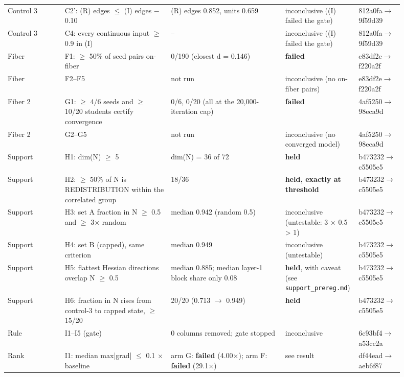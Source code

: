 {\begin{longtable}{R{0.14\linewidth} R{0.26\linewidth} R{0.29\linewidth} R{0.10\linewidth} R{0.11\linewidth}}
Control 3 & C2': (R) edges $\leq$ (I) edges $-$ 0.10 & (R) edges 0.852, units 0.659 & inconclusive ((I) failed the gate) & 812a0fa$\to$\allowbreak{}9f59d39 \\
Control 3 & C4: every continuous input $\geq$ 0.9 in (I) & -- & inconclusive ((I) failed the gate) & 812a0fa$\to$\allowbreak{}9f59d39 \\
Fiber & F1: $\geq$ 50\% of seed pairs on-fiber & 0/190 (closest d = 0.146) & \textbf{failed} & e83df2e$\to$\allowbreak{}f220a2f \\
Fiber & F2--F5 & not run & inconclusive (no on-fiber pairs) & e83df2e$\to$\allowbreak{}f220a2f \\
Fiber 2 & G1: $\geq$ 4/6 seeds and $\geq$ 10/20 students certify convergence & 0/6, 0/20 (all at the 20,000-iteration cap) & \textbf{failed} & 4af5250$\to$\allowbreak{}98eca9d \\
Fiber 2 & G2--G5 & not run & inconclusive (no converged model) & 4af5250$\to$\allowbreak{}98eca9d \\
Support & H1: dim(N) $\geq$ 5 & dim(N) = 36 of 72 & \textbf{held} & b473232$\to$\allowbreak{}c5505e5 \\
Support & H2: $\geq$ 50\% of N is REDISTRIBUTION within the correlated group & 18/36 & \textbf{held, exactly at threshold} & b473232$\to$\allowbreak{}c5505e5 \\
Support & H3: set A fraction in N $\geq$ 0.5 and $\geq$ 3$\times$ random & median 0.942 (random 0.5) & inconclusive (untestable: 3 $\times$ 0.5 > 1) & b473232$\to$\allowbreak{}c5505e5 \\
Support & H4: set B (capped), same criterion & median 0.949 & inconclusive (untestable) & b473232$\to$\allowbreak{}c5505e5 \\
Support & H5: flattest Hessian directions overlap N $\geq$ 0.5 & median 0.885; median layer-1 block share only 0.08 & \textbf{held}, with caveat (see \texttt{support\_\allowbreak{}prereg.md}) & b473232$\to$\allowbreak{}c5505e5 \\
Support & H6: fraction in N rises from control-3 to capped state, $\geq$ 15/20 & 20/20 (0.713 $\to$\allowbreak{} 0.949) & \textbf{held} & b473232$\to$\allowbreak{}c5505e5 \\
Rule & I1--I5 (gate) & 0 columns removed; gate stopped & inconclusive & 6c93bf4$\to$\allowbreak a53cc2a \\
Rank & I1: median max|grad| $\leq$ 0.1 $\times$ baseline & arm G: \textbf{failed} (4.00$\times$); arm F: \textbf{failed} (29.1$\times$) & see result & df44ead$\to$\allowbreak aeb6f87 \\

\end{longtable}}
